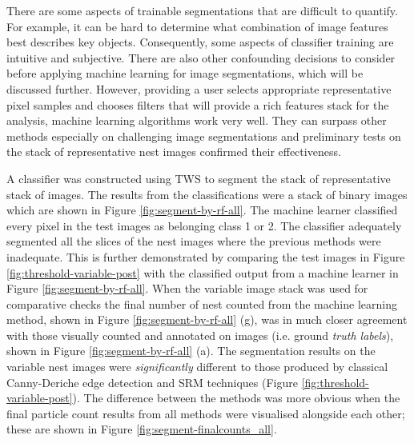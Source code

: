 There are some aspects of trainable segmentations that are difficult to quantify. For example, it can be hard to determine what combination of image features best describes key objects. Consequently, some aspects of classifier training are intuitive and subjective. There are also other confounding decisions to consider before applying machine learning for image segmentations, which will be discussed further. However, providing a user selects appropriate representative pixel samples and chooses filters that will provide a rich features stack for the analysis, machine learning algorithms work very well. They can surpass other methods especially on challenging image segmentations and preliminary tests on the stack of representative nest images confirmed their effectiveness.

A classifier was constructed using \ac{TWS} to segment the stack of representative stack of images. The results from the classifications were a stack of binary images which are shown in Figure \ref{fig:segment-by-rf-all}. The machine learner classified every pixel in the test images as belonging class 1 or 2. The classifier adequately segmented all the slices of the nest images where the previous methods were inadequate. This is further demonstrated by comparing the test images in Figure \ref{fig:threshold-variable-post} with the classified output from a machine learner in Figure \ref{fig:segment-by-rf-all}. When the variable image stack was used for comparative checks the final number of nest counted from the machine learning method, shown in Figure \ref{fig:segment-by-rf-all} (g), was in much closer agreement with those visually counted and annotated on images (i.e. ground \emph{truth labels}), shown in Figure \ref{fig:segment-by-rf-all} (a). The segmentation results on the variable nest images were \emph{significantly} different to those produced by classical Canny-Deriche edge detection and SRM techniques (Figure \ref{fig:threshold-variable-post}). The difference between the methods was more obvious when the final particle count results from all methods were visualised alongside each other; these are shown in Figure \ref{fig:segment-finalcounts_all}.

